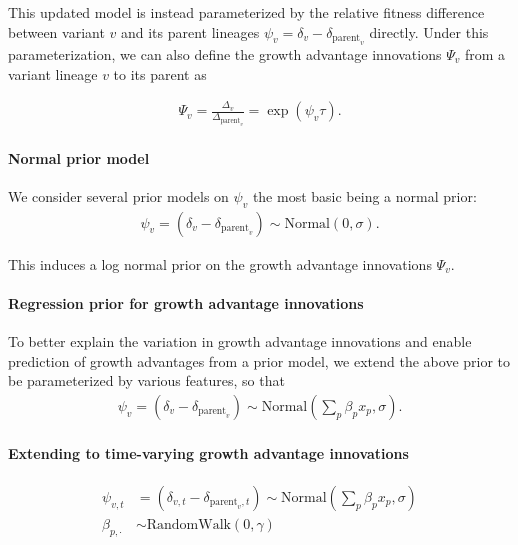 \documentclass[12pt,oneside,letterpaper]{article}
\begin{document}
This updated model is instead parameterized by the relative fitness difference between variant $v$ and its parent lineages $\psi_{v} = \delta_{v} - \delta_{\text{parent}_{v}}$ directly.
Under this parameterization, we can also define the  growth advantage innovations $\Psi_{v}$ from a variant lineage $v$ to its parent as

\begin{align*}
\Psi_{v} = \frac{\Delta_{v}}{\Delta_{\text{parent}_{v}}} = \exp(\psi_{v} \tau).
\end{align*}

\paragraph{Normal prior model}%

We consider several prior models on $\psi_{v}$ the most basic being a normal prior:
\begin{align*}
    \psi_{v} = (\delta_{v} - \delta_{\text{parent}_{v}}) \sim \text{Normal}(0, \sigma).
\end{align*}

This induces a log normal prior on the growth advantage innovations $\Psi_{v}$.

\paragraph{Regression prior for growth advantage innovations}%

To better explain the variation in growth advantage innovations and enable prediction of growth advantages from a prior model, we extend the above prior to be parameterized by various features, so that
\begin{align*}
    \psi_{v} = (\delta_{v} - \delta_{\text{parent}_{v}}) \sim \text{Normal} \left( \sum_{p} \beta_{p} x_{p}, \sigma \right).
\end{align*}

\paragraph{Extending to time-varying growth advantage innovations}%

\begin{align*}
    \psi_{v,t} &= (\delta_{v,t} - \delta_{\text{parent}_{v}, t}) \sim \text{Normal} \left( \sum_{p} \beta_{p} x_{p}, \sigma \right) \\
    \beta_{p, \cdot} &\sim \text{RandomWalk}(0, \gamma)
\end{align*}
\end{document}
